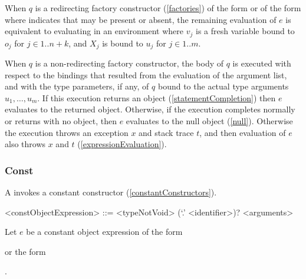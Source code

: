 \documentclass[makeidx]{article}
\begin{document}
{\LMHash{}%
When $q$ is a redirecting factory constructor
(\ref{factories})
of the form  or
of the form 
where  indicates that \CONST{} may be present or absent,
the remaining evaluation of $e$ is equivalent to
evaluating
in an environment where
$v_j$ is a fresh variable bound to $o_j$ for $j \in 1 .. n + k$, and
$X_j$ is bound to $u_j$ for $j \in 1 .. m$.
\EndCase

\LMHash{}%
When $q$ is a non-redirecting factory constructor,
the body of $q$ is executed with respect to
the bindings that resulted from the evaluation of the argument list,
and with the type parameters, if any, of $q$ bound to
the actual type arguments $u_1, \ldots, u_m$.
If this execution returns an object
(\ref{statementCompletion})
then $e$ evaluates to the returned object.
Otherwise, if the execution completes normally or returns with no object,
then $e$ evaluates to the null object (\ref{null}).
Otherwise the execution throws an exception $x$ and stack trace $t$,
and then evaluation of $e$ also throws $x$ and $t$
(\ref{expressionEvaluation}).

\EndCase


\subsubsection{Const}

\LMHash{}%
A  invokes a constant constructor
(\ref{constantConstructors}).

\begin{grammar}
<constObjectExpression> ::= \CONST{} <typeNotVoid> (`.' <identifier>)? <arguments>
\end{grammar}

\LMHash{}%
Let $e$ be a constant object expression of the form

or the form

.

}
\end{document}
